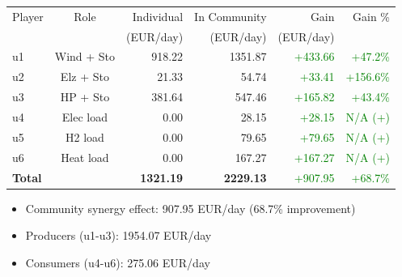 \begin{frame}
    \begin{table}[h]
    \centering
    \small
    \begin{tabular}{l|c|r|r|r|r}
    \toprule
    Player & Role & Individual & In Community & Gain & Gain \% \\
        &      & (EUR/day) & (EUR/day) & (EUR/day) & \\
    \midrule
    u1 & Wind + Sto & 918.22 & 1351.87 & \textcolor{green}{+433.66} & \textcolor{green}{+47.2\%} \\
u2 & Elz + Sto & 21.33 & 54.74 & \textcolor{green}{+33.41} & \textcolor{green}{+156.6\%} \\
u3 & HP + Sto & 381.64 & 547.46 & \textcolor{green}{+165.82} & \textcolor{green}{+43.4\%} \\
u4 & Elec load & 0.00 & 28.15 & \textcolor{green}{+28.15} & \textcolor{green}{N/A (+)} \\
u5 & H2 load & 0.00 & 79.65 & \textcolor{green}{+79.65} & \textcolor{green}{N/A (+)} \\
u6 & Heat load & 0.00 & 167.27 & \textcolor{green}{+167.27} & \textcolor{green}{N/A (+)} \\
\midrule
    \textbf{Total} & & \textbf{1321.19} & \textbf{2229.13} & \textcolor{green}{+907.95} & \textcolor{green}{+68.7\%} \\
    \bottomrule
    \end{tabular}
    \end{table}

    \vspace{0.5em}
    \begin{itemize}
    \item Community synergy effect: 907.95 EUR/day (68.7\% improvement)
    \item Producers (u1-u3): 1954.07 EUR/day
    \item Consumers (u4-u6): 275.06 EUR/day
    \end{itemize}
    \end{frame}